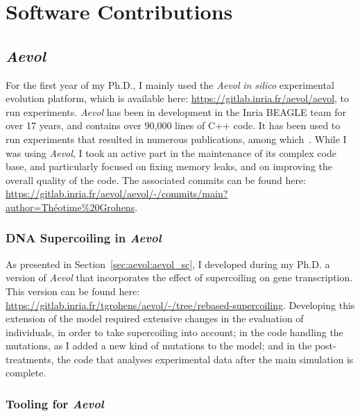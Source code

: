 \chapter{Software Contributions}
\label{chap:software}

\section{\emph{Aevol}}

For the first year of my Ph.D., I mainly used the \emph{Aevol} \emph{in silico} experimental evolution platform, which is available here: \url{https://gitlab.inria.fr/aevol/aevol}, to run experiments.
\emph{Aevol} has been in development in the Inria BEAGLE team for over 17 years, and contains over 90,000 lines of C++ code.
It has been used to run experiments that resulted in numerous publications, among which~\cite{knibbe2005,batut2013,rutten2019}.
While I was using \emph{Aevol}, I took an active part in the maintenance of its complex code base, and particularly focused on fixing memory leaks, and on improving the overall quality of the code.
The associated commits can be found here: \url{https://gitlab.inria.fr/aevol/aevol/-/commits/main?author=Théotime%20Grohens}.

\subsection{DNA Supercoiling in \emph{Aevol}}

As presented in Section~\ref{sec:aevol:aevol_sc}, I developed during my Ph.D. a version of \emph{Aevol} that incorporates the effect of supercoiling on gene transcription.
This version can be found here: \url{https://gitlab.inria.fr/tgrohens/aevol/-/tree/rebased-supercoiling}.
Developing this extension of the model required extensive changes in the evaluation of individuals, in order to take supercoiling into account; in the code handling the mutations, as I added a new kind of mutations to the model; and in the post-treatments, the code that analyses experimental data after the main simulation is complete.

\subsection{Tooling for \emph{Aevol}}

